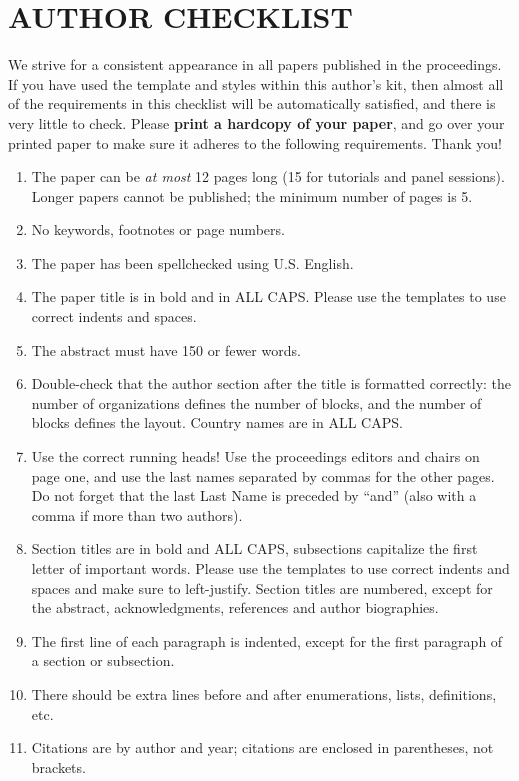 \documentclass{wscpaperproc}
\theoremstyle{wsc}
\begin{document}
\section{AUTHOR CHECKLIST}

We strive for a consistent appearance in all papers published in the proceedings. If you have used the template and styles within this author’s kit, then almost all of the requirements in this checklist will be automatically satisfied, and there is very little to check. Please {\bf print a hardcopy of your paper}, and go over your printed paper to make sure it adheres to the following requirements. Thank you!

\begin{enumerate}
\item The paper can be \textit{at most} 12 pages long (15 for tutorials and panel sessions). Longer papers cannot be published; the minimum number of pages is 5.
\item No keywords, footnotes or page numbers.
\item The paper has been spellchecked using U.S. English.
\item	The paper title is in bold and in ALL CAPS. Please use the templates to use correct indents and spaces.
\item The abstract must have 150 or fewer words.
\item	Double-check that the author section after the title is formatted correctly: the number of organizations defines the number of blocks, and the number of blocks defines the layout. Country names are in ALL CAPS.
\item	Use the correct running heads! Use the proceedings editors and chairs on page one, and use the last names separated by commas for the other pages. Do not forget that the last Last Name is preceded by ``and'' (also with a comma if more than two authors). 
\item Section titles are in bold and ALL CAPS, subsections capitalize the first letter of important words. Please use the templates to use correct indents and spaces and make sure to left-justify. Section titles are numbered, except for the abstract, acknowledgments, references and author biographies.
\item The first line of each paragraph is indented, except for the first paragraph of a section or subsection.
\item There should be extra lines before and after enumerations, lists, definitions, etc.
\item Citations are by author and year; citations are enclosed in parentheses, not brackets.

\end{enumerate}
\end{document}
